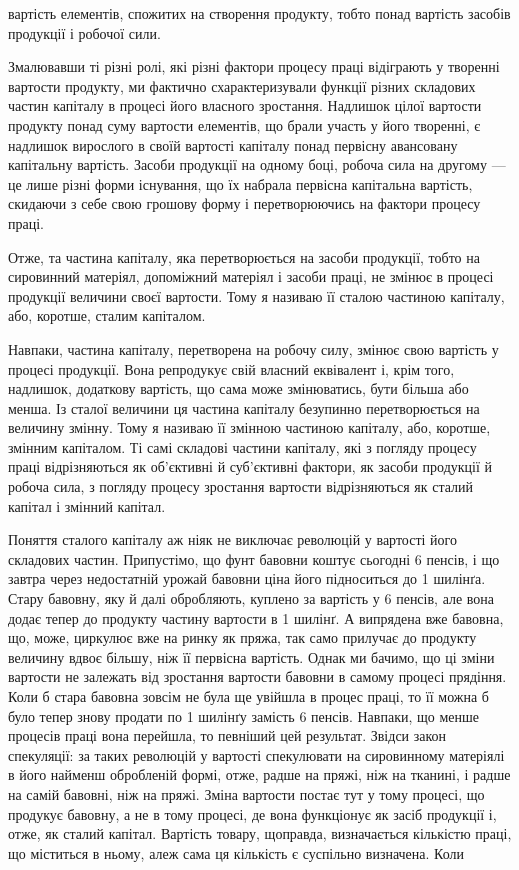 \parcont{}  %
вартість елементів, спожитих на створення продукту, тобто понад вартість засобів продукції і робочої
сили.

Змалювавши ті різні ролі, які різні фактори процесу праці відіграють у творенні вартости продукту,
ми фактично схарактеризували функції різних складових частин капіталу в процесі його власного
зростання. Надлишок цілої вартости продукту понад суму вартости елементів, що брали участь у його
творенні, є надлишок вирослого в своїй вартості капіталу понад первісну авансовану капітальну
вартість. Засоби продукції на одному боці, робоча сила на другому — це лише різні форми існування,
що їх набрала первісна капітальна вартість, скидаючи з себе свою грошову форму і перетворюючись на
фактори процесу праці.

Отже, та частина капіталу, яка перетворюється на засоби продукції,
тобто на сировинний матеріял, допоміжний матеріял і засоби праці, не змінює в процесі продукції
величини своєї вартости. Тому я називаю її сталою частиною капіталу, або, коротше, сталим капіталом.

Навпаки, частина капіталу, перетворена на робочу силу, змінює свою вартість у процесі продукції.
Вона репродукує свій власний еквівалент і, крім того, надлишок, додаткову вартість, що сама може
змінюватись, бути більша або менша. Із сталої величини ця частина капіталу безупинно перетворюється
на величину
змінну. Тому я називаю її змінною частиною капіталу, або, коротше, змінним капіталом. Ті самі
складові частини капіталу, які з погляду процесу праці відрізняються як об’єктивні й суб’єктивні
фактори, як засоби продукції й робоча сила, з погляду процесу зростання вартости відрізняються як
сталий капітал і
змінний капітал.

Поняття сталого капіталу аж ніяк не виключає революцій у вартості його складових частин. Припустімо,
що фунт бавовни коштує сьогодні 6 пенсів, і що завтра через недостатній урожай
бавовни ціна його підноситься до 1 шилінґа. Стару бавовну, яку й далі обробляють, куплено за
вартість у 6 пенсів, але вона додає тепер до продукту частину вартости в 1 шилінґ. А випрядена вже
бавовна, що, може, циркулює вже на ринку як пряжа, так само прилучає до продукту величину вдвоє
більшу, ніж її первісна
вартість. Однак ми бачимо, що ці зміни вартости не залежать від зростання вартости бавовни в самому
процесі прядіння. Коли б стара бавовна зовсім не була ще увійшла в процес праці, то її
можна б було тепер знову продати по 1 шилінґу замість 6 пенсів. Навпаки, що менше процесів праці
вона перейшла, то певніший цей результат. Звідси закон спекуляції: за таких революцій у
вартості спекулювати на сировинному матеріялі в його найменш обробленій формі, отже, радше на пряжі,
ніж на тканині, і радше на самій бавовні, ніж на пряжі. Зміна вартости постає тут у тому процесі, що
продукує бавовну, а не в тому процесі, де вона функціонує як засіб продукції і, отже, як сталий
капітал. Вартість товару, щоправда, визначається кількістю праці, що міститься в ньому, алеж сама ця
кількість є суспільно визначена. Коли
\parbreak{}  %
